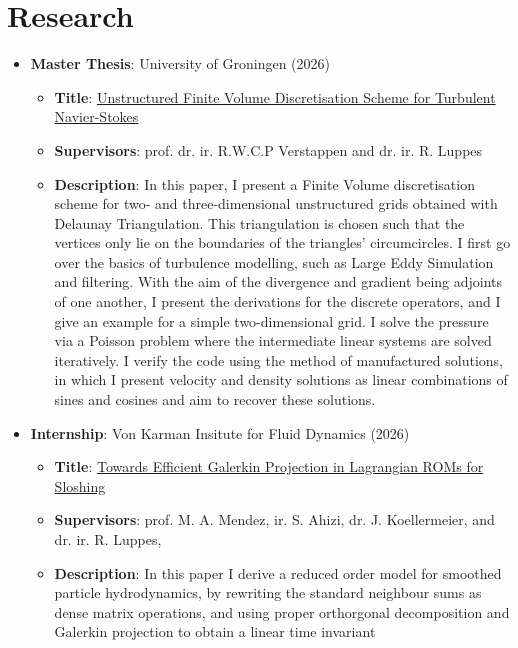\section*{Research}
\begin{itemize}
    \item \textbf{Master Thesis}: University of Groningen (2026) \begin{itemize}
        \item \textbf{Title}: \href{https://milenemdvl.github.io/CV/theses/MasterThesis.pdf}{Unstructured Finite Volume Discretisation Scheme for Turbulent Navier-Stokes}
        \item \textbf{Supervisors}: prof. dr. ir. R.W.C.P Verstappen and dr. ir. R. Luppes 
        \item \textbf{Description}: In this paper, I present a Finite Volume discretisation scheme for two- and three-dimensional unstructured grids obtained with Delaunay Triangulation. This triangulation is chosen such that the vertices only lie on the boundaries of the triangles' circumcircles. I first go over the basics of turbulence modelling, such as Large Eddy Simulation and filtering. With the aim of the divergence and gradient being adjoints of one another, I present the derivations for the discrete operators, and I give an example for a simple two-dimensional grid. I solve the pressure via a Poisson problem where the intermediate linear systems are solved iteratively. I verify the code using the method of manufactured solutions, in which I present velocity and density solutions as linear combinations of sines and cosines and aim to recover these solutions.
    \end{itemize}
    \item \textbf{Internship}: Von Karman Insitute for Fluid Dynamics (2026) \begin{itemize}
        \item \textbf{Title}: \href{https://milenemdvl.github.io/CV/theses/InternshipThesis.pdf}{Towards Efficient Galerkin Projection in
        Lagrangian ROMs for Sloshing}
        \item \textbf{Supervisors}: prof. M. A. Mendez, ir. S. Ahizi,  dr. J. Koellermeier, and dr. ir. R.
        Luppes,
        \item \textbf{Description}: In this paper I derive a reduced order model for
        smoothed particle hydrodynamics, by rewriting the standard neighbour
        sums as dense matrix operations, and using proper orthorgonal
        decomposition and Galerkin projection to obtain a linear time invariant

\end{itemize}
\end{itemize}
